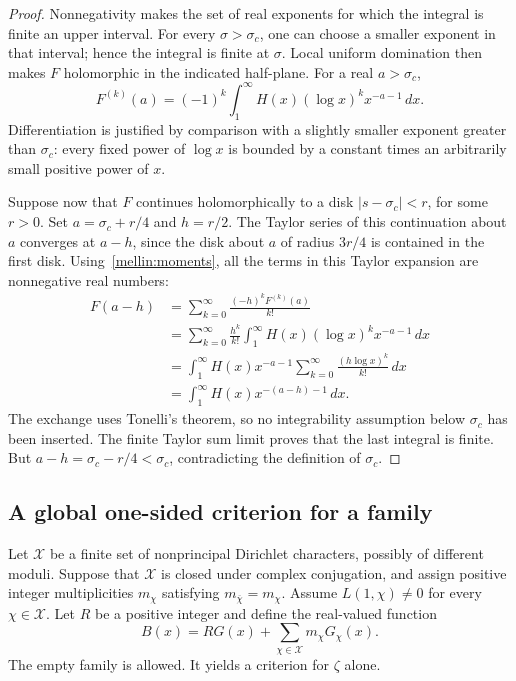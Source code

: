 \begin{proof}
Nonnegativity makes the set of real exponents for which the integral
is finite an upper interval.  For every $\sigma>\sigma_c$, one can
choose a smaller exponent in that interval; hence the integral is
finite at $\sigma$.  Local uniform domination then makes $F$ holomorphic
in the indicated half-plane.  For a real $a>\sigma_c$,
\begin{equation}\label{mellin:moments}
 F^{(k)}(a)=(-1)^k\int_1^\infty
          H(x)(\log x)^k x^{-a-1}\,dx.
\end{equation}
Differentiation is justified by comparison with a slightly smaller
exponent greater than $\sigma_c$: every fixed power of $\log x$ is
bounded by a constant times an arbitrarily small positive power of $x$.

Suppose now that $F$ continues holomorphically to a disk
$|s-\sigma_c|<r$, for some $r>0$.  Set
$a=\sigma_c+r/4$ and $h=r/2$.  The Taylor series of this continuation
about $a$ converges at $a-h$, since the disk about $a$ of radius $3r/4$
is contained in the first disk.  Using~\eqref{mellin:moments}, all the
terms in this Taylor expansion are nonnegative real numbers:
\begin{align*}
 F(a-h)
  &=\sum_{k=0}^{\infty}\frac{(-h)^kF^{(k)}(a)}{k!}\\
  &=\sum_{k=0}^{\infty}\frac{h^k}{k!}
       \int_1^\infty H(x)(\log x)^k x^{-a-1}\,dx\\
  &=\int_1^\infty H(x)x^{-a-1}
       \sum_{k=0}^{\infty}\frac{(h\log x)^k}{k!}\,dx\\
  &=\int_1^\infty H(x)x^{-(a-h)-1}\,dx.
\end{align*}
The exchange uses Tonelli's theorem, so no integrability assumption
below $\sigma_c$ has been inserted.  The finite Taylor sum limit proves
that the last integral is finite.  But
$a-h=\sigma_c-r/4<\sigma_c$, contradicting the definition of
$\sigma_c$.
\end{proof}

\subsection{A global one-sided criterion for a family}

Let $\mathcal X$ be a finite set of nonprincipal Dirichlet characters,
possibly of different moduli.  Suppose that $\mathcal X$ is closed
under complex conjugation, and assign positive integer multiplicities
$m_\chi$ satisfying $m_{\overline\chi}=m_\chi$.  Assume
$L(1,\chi)\neq0$ for every $\chi\in\mathcal X$.  Let $R$ be a positive
integer and define the real-valued function
\begin{equation}\label{mellin:B}
 B(x)=R G(x)+\sum_{\chi\in\mathcal X}m_\chi G_\chi(x).
\end{equation}
The empty family is allowed.  It yields a criterion for $\zeta$ alone.

